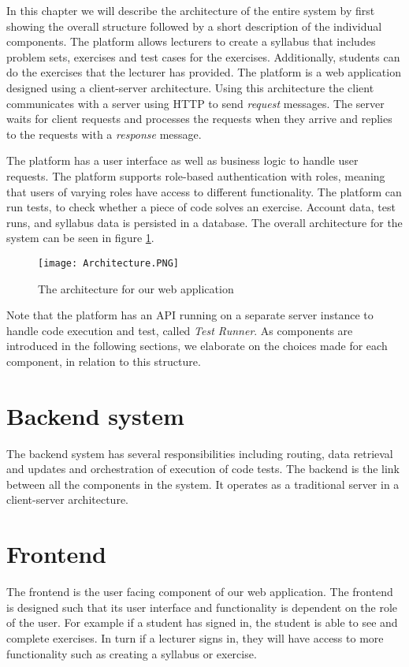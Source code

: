 In this chapter we will describe the architecture of the entire system by first showing the overall structure followed by a short description of the individual components.
The platform allows lecturers to create a syllabus that includes problem sets, exercises and test cases for the exercises. Additionally, students can do the exercises that the lecturer has provided.
The platform is a web application designed using a client-server architecture. Using this architecture the client communicates with a server using HTTP to send \textit{request} messages. The server waits for client requests and processes the requests when they arrive and replies to the requests with a \textit{response} message.

The platform has a user interface as well as business logic to handle user requests. The platform supports role-based authentication with roles, meaning that users of varying roles have access to different functionality. The platform can run tests, to check whether a piece of code solves an exercise. Account data, test runs, and syllabus data is persisted in a database.
The overall architecture for the system can be seen in figure \ref{fig:Architecture}.

\begin{figure}[H]
	\texttt{[image: Architecture.PNG]}
	\centering
	\caption{The architecture for our web application}
	\label{fig:Architecture}
\end{figure}

Note that the platform has an API running on a separate server instance to handle code execution and test, called \textit{Test Runner}. As components are introduced in the following sections, we elaborate on the choices made for each component, in relation to this structure.

\section{Backend system}
The backend system has several responsibilities including routing, data retrieval and updates and orchestration of execution of code tests. The backend is the link between all the components in the system. It operates as a traditional server in a client-server architecture.

\section{Frontend}
The frontend is the user facing component of our web application. The frontend is designed such that its user interface and functionality is dependent on the role of the user.
For example if a student has signed in, the student is able to see and complete exercises. In turn if a lecturer signs in, they will have access to more functionality such as creating a syllabus or exercise.

